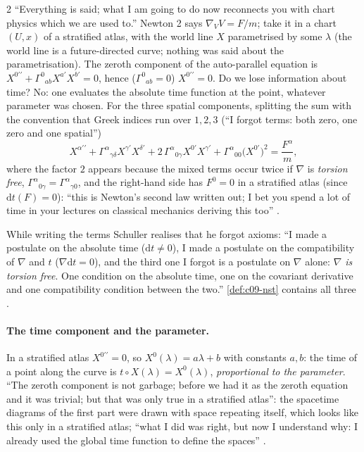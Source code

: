 \begin{paracol}{2}
``Everything is said; what I am going to do now reconnects you with chart physics which we are used to.'' Newton 2 says $\nabla_VV=F/m$; take it in a chart $(U,x)$ of a stratified atlas, with the world line $X$ parametrised by some $\lambda$ (the world line is a future-directed curve; nothing was said about the parametrisation). The zeroth component of the auto-parallel equation is $X^{0\prime\prime}+\Gamma^0{}_{ab}X^{a\prime}X^{b\prime}=0$, hence ($\Gamma^0{}_{ab}=0$) $X^{0\prime\prime}=0$. Do we lose information about time? No: one evaluates the absolute time function at the point, whatever parameter was chosen. For the three spatial components, splitting the sum with the convention that Greek indices run over $1,2,3$ (``I forgot terms: both zero, one zero and one spatial'')
\[
  X^{\alpha\prime\prime}+\Gamma^\alpha{}_{\gamma\delta}X^{\gamma\prime}X^{\delta\prime}+2\,\Gamma^\alpha{}_{0\gamma}X^{0\prime}X^{\gamma\prime}+\Gamma^\alpha{}_{00}\bigl(X^{0\prime}\bigr)^2=\frac{F^\alpha}{m},
\]
where the factor $2$ appears because the mixed terms occur twice if $\nabla$ is \emph{torsion free}, $\Gamma^\alpha{}_{0\gamma}=\Gamma^\alpha{}_{\gamma0}$, and the right-hand side has $F^0=0$ in a stratified atlas (since $\mathrm dt(F)=0$): ``this is Newton's second law written out; I bet you spend a lot of time in your lectures on classical mechanics deriving this too''
.

\begin{coursenote}
While writing the terms Schuller realises that he forgot axioms: ``I made a postulate on the absolute time ($\mathrm dt\neq0$), I made a postulate on the compatibility of $\nabla$ and $t$ ($\nabla\mathrm dt=0$), and the third one I forgot is a postulate on $\nabla$ alone: \emph{$\nabla$ is torsion free}. One condition on the absolute time, one on the covariant derivative and one compatibility condition between the two.'' \cref{def:c09-nst} contains all three .
\end{coursenote}

\paragraph{The time component and the parameter.} In a stratified atlas $X^{0\prime\prime}=0$, so $X^0(\lambda)=a\lambda+b$ with constants $a,b$: the time of a point along the curve is $t\circ X(\lambda)=X^0(\lambda)$, \emph{proportional to the parameter}. ``The zeroth component is not garbage; before we had it as the zeroth equation and it was trivial; but that was only true in a stratified atlas'': the spacetime diagrams of the first part were drawn with space repeating itself, which looks like this only in a stratified atlas; ``what I did was right, but now I understand why: I already used the global time function to define the spaces''
.


\end{paracol}
